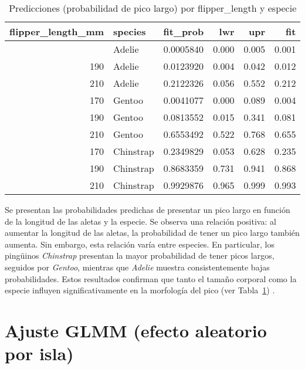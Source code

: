 \documentclass[
  spanish,
  11pt,
  a4paper,
  DIV=11,
  numbers=noendperiod]{scrartcl}
\begin{document}
\begin{longtable}[]{@{}rlrrrr@{}}

\caption{\label{tbl-glm_pred_table}Predicciones (probabilidad de pico
largo) por flipper\_length y especie}

\tabularnewline

\toprule\noalign{}
flipper\_length\_mm & species & fit\_prob & lwr & upr & fit \\
\midrule\noalign{}
\endhead
\bottomrule\noalign{}
\endlastfoot
170 & Adelie & 0.0005840 & 0.000 & 0.005 & 0.001 \\
190 & Adelie & 0.0123920 & 0.004 & 0.042 & 0.012 \\
210 & Adelie & 0.2122326 & 0.056 & 0.552 & 0.212 \\
170 & Gentoo & 0.0041077 & 0.000 & 0.089 & 0.004 \\
190 & Gentoo & 0.0813552 & 0.015 & 0.341 & 0.081 \\
210 & Gentoo & 0.6553492 & 0.522 & 0.768 & 0.655 \\
170 & Chinstrap & 0.2349829 & 0.053 & 0.628 & 0.235 \\
190 & Chinstrap & 0.8683359 & 0.731 & 0.941 & 0.868 \\
210 & Chinstrap & 0.9929876 & 0.965 & 0.999 & 0.993 \\

\end{longtable}

Se presentan las probabilidades predichas de presentar un pico largo en
función de la longitud de las aletas y la especie. Se observa una
relación positiva: al aumentar la longitud de las aletas, la
probabilidad de tener un pico largo también aumenta. Sin embargo, esta
relación varía entre especies. En particular, los pingüinos
\emph{Chinstrap} presentan la mayor probabilidad de tener picos largos,
seguidos por \emph{Gentoo}, mientras que \emph{Adelie} muestra
consistentemente bajas probabilidades. Estos resultados confirman que
tanto el tamaño corporal como la especie influyen significativamente en
la morfología del pico (ver Tabla~\ref{tbl-glm_pred_table}) .

\section{Ajuste GLMM (efecto aleatorio por
isla)}\label{ajuste-glmm-efecto-aleatorio-por-isla}
\end{document}
